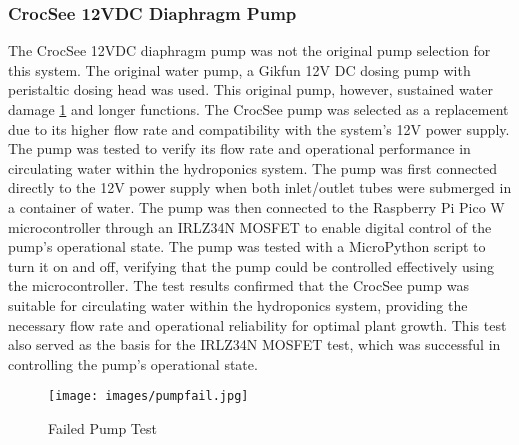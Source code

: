 \documentclass[12pt]{article} %
\begin{document}
\subsubsection{CrocSee 12VDC Diaphragm Pump}
\noindent The CrocSee 12VDC diaphragm pump \cite{ref_crocsee} was not the original pump selection for this system. The original water pump, a Gikfun 12V DC dosing pump with peristaltic dosing head \cite{ref_gikfun} was used. This original pump, however, sustained water damage \ref{fig:Pump Fail} and longer functions. The CrocSee pump was selected as a replacement due to its higher flow rate and compatibility with the system's 12V power supply. The pump was tested to verify its flow rate and operational performance in circulating water within the hydroponics system. The pump was first connected directly to the 12V power supply when both inlet/outlet tubes were submerged in a container of water. The pump was then connected to the Raspberry Pi Pico W microcontroller through an IRLZ34N MOSFET to enable digital control of the pump's operational state. The pump was tested with a MicroPython script to turn it on and off, verifying that the pump could be controlled effectively using the microcontroller. The test results confirmed that the CrocSee pump was suitable for circulating water within the hydroponics system, providing the necessary flow rate and operational reliability for optimal plant growth. This test also served as the basis for the IRLZ34N MOSFET test, which was successful in controlling the pump's operational state.
\begin{figure}[H]
    \centering
    \texttt{[image: images/pumpfail.jpg]}
    \caption{Failed Pump Test}
    \label{fig:Pump Fail}
\end{figure}
\end{document}
